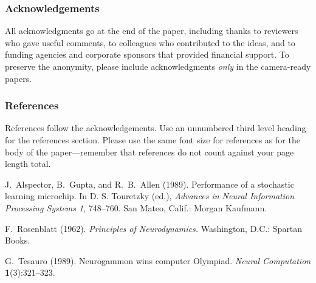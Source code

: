 \documentclass[twoside]{article}
\begin{document}
\subsubsection*{Acknowledgements}
All acknowledgments go at the end of the paper, including thanks to reviewers who gave useful comments, to colleagues who contributed to the ideas, and to funding agencies and corporate sponsors that provided financial support. 
To preserve the anonymity, please include acknowledgments \emph{only} in the camera-ready papers.


\subsubsection*{References}

References follow the acknowledgements.  Use an unnumbered third level
heading for the references section.  Please use the same font
size for references as for the body of the paper---remember that
references do not count against your page length total.

\begin{thebibliography}{}
\setlength{\itemindent}{-\leftmargin}
\makeatletter\renewcommand{\@biblabel}[1]{}\makeatother
\bibitem{} J.~Alspector, B.~Gupta, and R.~B.~Allen (1989).
    \newblock Performance of a stochastic learning microchip.
    \newblock In D. S. Touretzky (ed.),
    \textit{Advances in Neural Information Processing Systems 1}, 748--760.
    San Mateo, Calif.: Morgan Kaufmann.

\bibitem{} F.~Rosenblatt (1962).
    \newblock \textit{Principles of Neurodynamics.}
    \newblock Washington, D.C.: Spartan Books.

\bibitem{} G.~Tesauro (1989).
    \newblock Neurogammon wins computer Olympiad.
    \newblock \textit{Neural Computation} \textbf{1}(3):321--323.
\end{thebibliography}
\end{document}
